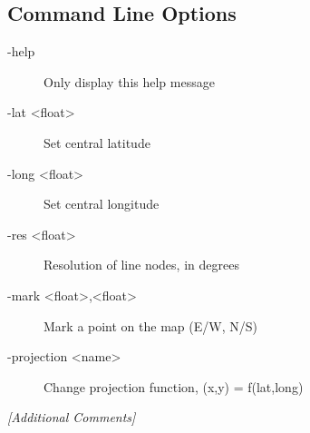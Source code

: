 \subsection{Command Line Options}
\label{sec:wdb2svg.pl-command-line}

\begin{description}
\item[-help] Only display this help message
\item[-lat <float>] Set central latitude
\item[-long <float>] Set central longitude
\item[-res <float>] Resolution of line nodes, in degrees
\item[-mark <float>,<float>] Mark a point on the map (E/W, N/S)
\item[-projection <name>] Change projection function, (x,y) = f(lat,long)
\end{description}

\emph{[Additional Comments]}

